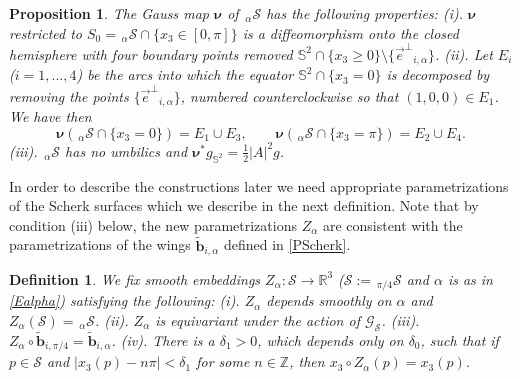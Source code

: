 \documentclass[12pt,namelimits,sumlimits]{amsart}
\newtheorem{prop}[theorem]{Proposition}
\newtheorem{definition}[theorem]{Definition}
\theoremstyle{remark}
\numberwithin{equation}{section}
\begin{document}
\addtocounter{equation}{1}
\begin{prop}
\label{Pgauss}
The Gauss map ${\boldsymbol{\nu}}$ of ${{{}_{\,\alpha\!}\mathcal{S}}}$ has the following properties:
\newline
(i).
${\boldsymbol{\nu}}$ restricted to
$S_0={{{}_{\,\alpha\!}\mathcal{S}}}\cap\{x_3\in[0,\pi]\}$
is a diffeomorphism onto
the closed hemisphere with four boundary points removed
${{{\mathbb{S}}^2}}\cap\{x_3\ge0\}\setminus\{{{\vec{e}^\perp}}_{{i,\alpha}}\}$.
\newline
(ii). Let $E_i$ ($i=1,...,4$)
be the arcs into which the equator
${{{\mathbb{S}}^2}}\cap\{x_3=0\}$ is decomposed by removing the points 
$\{{{\vec{e}^\perp}}_{{i,\alpha}}\}$,
numbered counterclockwise so that $(1,0,0)\in E_1$.
We have then
$$
{\boldsymbol{\nu}}({{{}_{\,\alpha\!}\mathcal{S}}}\cap\{x_3=0\})=E_1\cup E_3,
\qquad
{\boldsymbol{\nu}}({{{}_{\,\alpha\!}\mathcal{S}}}\cap\{x_3=\pi\})=E_2\cup E_4.
$$
(iii). ${{{}_{\,\alpha\!}\mathcal{S}}}$ has no umbilics and ${\boldsymbol{\nu}}^*g_{{{\mathbb{S}}^2}}=\frac12|A|^2g$.
\end{prop}

In order to describe the constructions later we need appropriate parametrizations of the
Scherk surfaces which we describe in the next definition.
Note that
by condition (iii) below,
the new parametrizations $Z_\alpha$ are consistent with the parametrizations
of the wings 
${\widetilde{\boldsymbol{b}}}_{{i,\alpha}}$
defined in \ref{PScherk}.

\addtocounter{equation}{1}
\begin{definition}
\label{DZalpha}
We fix smooth embeddings
$ Z_\alpha:{{\mathcal{S}}}\to{{{\mathbb{R}}^3}}$
(${{\mathcal{S}}}:={{{}_{\,\pi/4\!}\mathcal{S}}}$ 
and 
$\alpha$ is as in \ref{Ealpha})
satisfying the following:
\newline
(i).
$ Z_\alpha$ depends smoothly on $\alpha$ and
$Z_\alpha({{\mathcal{S}}})={{{}_{\,\alpha\!}\mathcal{S}}}$.
\newline
(ii).
$ Z_\alpha$ is equivariant under the action of ${{\mathscr{G}_{{\mathcal{S}}}}}$.
\newline
(iii).
$ Z_\alpha\circ
{\widetilde{\boldsymbol{b}}}_{i,\pi/4}=
{\widetilde{\boldsymbol{b}}}_{{i,\alpha}}$.
\newline
(iv).
There is a $\delta_1>0$, which depends only on $\delta_0$,
such that if $p\in{{\mathcal{S}}}$ and
$|x_3(p)-n\pi|<\delta_1$
for some $n\in \mathbb{Z}$,
then
$x_3\circ Z_\alpha(p)=x_3(p)$.
\end{definition}
\end{document}
